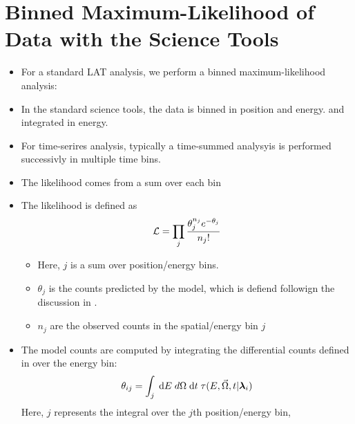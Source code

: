 \section{Binned Maximum-Likelihood of  Data with the Science Tools}


\begin{itemize}
  \item For a standard LAT analysis, we perform a binned maximum-likelihood analysis:
  \item In the standard science tools, the data is binned in position and energy.
    and integrated in energy.
  \item For time-serires analysis, typically a time-summed analysyis is performed successivly in
    multiple time bins.
  \item The likelihood comes from a sum over each bin
  \item The likelihood is defined as
    \begin{equation}
      \mathcal{L}=\prod_j \frac{\theta_j^{n_j} e^{-\theta_j}}{n_j!}
    \end{equation}
    \begin{itemize}
      \item Here, $j$ is a sum over position/energy bins.
      \item $\theta_j$ is the counts predicted by the model, which
        is defiend followign the discussion in .
      \item $n_j$ are the observed counts in the spatial/energy bin $j$
    \end{itemize}
  \item The model counts are computed by integrating the differential
    counts defined in  over the energy bin:
    \begin{equation}
      \theta_{ij} = \int_j \; \text{d}E \; 
      d\Omega \; \text{d}t \; 
      \tau(E,\vec\Omega,t|\boldsymbol{\lambda}_i)
    \end{equation}
    Here, $j$ represents the integral over the $j$th position/energy bin,

\end{itemize}
